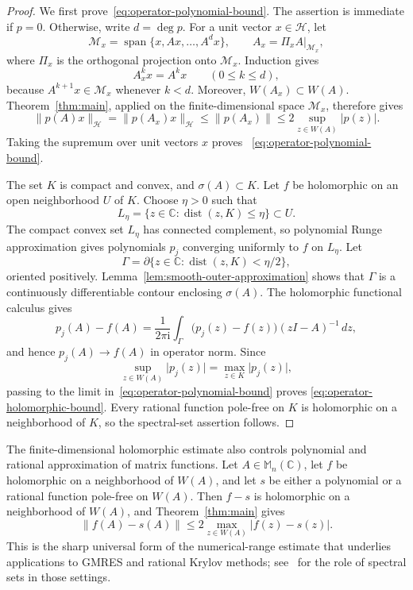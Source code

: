 \documentclass[preprints,article,submit,oneauthor]{Definitions/mdpi}
\theoremstyle{mdpi}
\theoremstyle{definition}
\newcommand{\C}{\mathbb C}
\newcommand{\Mn}{\mathbb M_n(\C)}
\newcommand{\distop}{\operatorname{dist}}
\newcommand{\iu}{\mathrm{i}}
\begin{document}
\begin{proof}
We first prove~\eqref{eq:operator-polynomial-bound}.  The assertion is
immediate if $p=0$.  Otherwise, write $d=\deg p$.
For a unit vector $x\in\mathcal H$, let
\[
  \mathcal M_x=\operatorname{span}\{x,Ax,\ldots,A^d x\},
  \qquad
  A_x=\left.\Pi_x A\right|_{\mathcal M_x},
\]
where $\Pi_x$ is the orthogonal projection onto
$\mathcal M_x$.  Induction gives
\begin{equation}
  A_x^k x=A^k x \qquad(0\leq k\leq d),
  \label{eq:Krylov-agreement}
\end{equation}
because $A^{k+1}x\in\mathcal M_x$ whenever $k<d$.  Moreover,
$W(A_x)\subset W(A)$.  Theorem~\ref{thm:main}, applied on the
finite-dimensional space $\mathcal M_x$, therefore gives
\[
  \lVert p(A)x\rVert_{\mathcal H}
  =\lVert p(A_x)x\rVert_{\mathcal H}
  \leq\lVert p(A_x)\rVert
  \leq2\sup_{z\in W(A)}\lvert p(z)\rvert.
\]
Taking the supremum over unit vectors $x$ proves~%
\eqref{eq:operator-polynomial-bound}.

The set $K$ is compact and convex, and $\sigma(A)\subset K$.  Let $f$
be holomorphic on an open neighborhood $U$ of $K$.  Choose $\eta>0$
such that
\[
  L_\eta=\{z\in\C:\distop(z,K)\leq\eta\}\subset U.
\]
The compact convex set $L_\eta$ has connected complement, so polynomial
Runge approximation gives polynomials $p_j$ converging uniformly to
$f$ on $L_\eta$.  Let
\[
  \Gamma=\partial\{z\in\C:\distop(z,K)<\eta/2\},
\]
oriented positively.  Lemma~\ref{lem:smooth-outer-approximation}
shows that $\Gamma$ is a continuously differentiable contour enclosing
$\sigma(A)$.  The holomorphic functional calculus gives
\[
  p_j(A)-f(A)
  =\frac{1}{2\pi\iu}\int_\Gamma
  \bigl(p_j(z)-f(z)\bigr)(zI-A)^{-1}\,dz,
\]
and hence $p_j(A)\to f(A)$ in operator norm.  Since
\[
  \sup_{z\in W(A)}\lvert p_j(z)\rvert
  =\max_{z\in K}\lvert p_j(z)\rvert,
\]
passing to the limit in~\eqref{eq:operator-polynomial-bound} proves
\eqref{eq:operator-holomorphic-bound}.  Every rational function
pole-free on $K$ is holomorphic on a neighborhood of $K$, so the
spectral-set assertion follows.
\end{proof}

The finite-dimensional holomorphic estimate also controls polynomial
and rational approximation of matrix functions.  Let $A\in\Mn$, let
$f$ be holomorphic on a
neighborhood of $W(A)$, and let $s$ be either a polynomial or a
rational function pole-free on $W(A)$.  Then $f-s$ is holomorphic on
a neighborhood of $W(A)$, and Theorem~\ref{thm:main} gives
\begin{equation}
  \lVert f(A)-s(A)\rVert
  \leq2\max_{z\in W(A)}\lvert f(z)-s(z)\rvert.
  \label{eq:matrix-function-error}
\end{equation}
This is the sharp universal form of the numerical-range estimate that
underlies applications to GMRES and rational Krylov methods; see~%
\cite{ChoiGreenbaum2015,CrouzeixGreenbaum2019,ChenGreenbaumTrogdon2025}
for the role of spectral sets in those settings.
\end{document}
